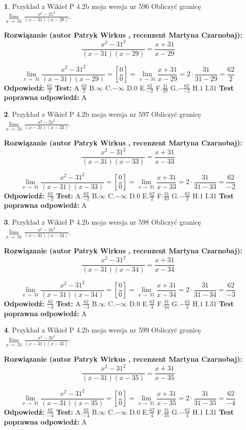 \documentclass[12pt, a4paper]{article}
\theoremstyle{definition} %
\newtheorem{zad}{}
\newcommand{\zadStart}[1]{\begin{zad}#1\newline}
\newcommand{\zadStop}{\end{zad}}
\newcommand{\rozwStart}[2]{\noindent \textbf{Rozwiązanie (autor #1 , recenzent #2): }\newline}
\newcommand{\rozwStop}{\newline}
\newcommand{\odpStart}{\noindent \textbf{Odpowiedź:}\newline}
\newcommand{\odpStop}{\newline}
\newcommand{\testStart}{\noindent \textbf{Test:}\newline}
\newcommand{\testStop}{\newline}
\newcommand{\kluczStart}{\noindent \textbf{Test poprawna odpowiedź:}\newline}
\newcommand{\kluczStop}{\newline}
\begin{document}
\zadStart{Przykład z Wikieł P 4.2b moja wersja nr 596}
Obliczyć granicę $\lim\limits_{x\to\ 31}\frac{x^{2}-31^{2}}{(x-31)(x-29)}$.
\zadStop
\rozwStart{Patryk Wirkus}{Martyna Czarnobaj}
$$\frac{x^{2}-31^{2}}{(x-31)(x-29)}=\frac{x+31}{x-29}$$

$$\lim\limits_{x\to\ 31}\frac{x^{2}-31^{2}}{(x-31)(x-29)}=[\frac{0}{0}]=\lim\limits_{x\to\ 31}\frac{x+31}{x-29}=2 \cdot \frac{31}{31-29} = \frac{62}{2}$$
\rozwStop
\odpStart
$\frac{62}{2}$
\odpStop
\testStart
A.$\frac{62}{2}$
B.$\infty$
C.$-\infty$
D.$0$
E.$\frac{62}{-2}$
F.$\frac{31}{29}$
G.$-\frac{62}{-2}$
H.$1$
I.$31$
\testStop
\kluczStart
A
\kluczStop



\zadStart{Przykład z Wikieł P 4.2b moja wersja nr 597}
Obliczyć granicę $\lim\limits_{x\to\ 31}\frac{x^{2}-31^{2}}{(x-31)(x-33)}$.
\zadStop
\rozwStart{Patryk Wirkus}{Martyna Czarnobaj}
$$\frac{x^{2}-31^{2}}{(x-31)(x-33)}=\frac{x+31}{x-33}$$

$$\lim\limits_{x\to\ 31}\frac{x^{2}-31^{2}}{(x-31)(x-33)}=[\frac{0}{0}]=\lim\limits_{x\to\ 31}\frac{x+31}{x-33}=2 \cdot \frac{31}{31-33} = \frac{62}{-2}$$
\rozwStop
\odpStart
$\frac{62}{-2}$
\odpStop
\testStart
A.$\frac{62}{-2}$
B.$\infty$
C.$-\infty$
D.$0$
E.$\frac{62}{2}$
F.$\frac{31}{33}$
G.$-\frac{62}{2}$
H.$1$
I.$31$
\testStop
\kluczStart
A
\kluczStop



\zadStart{Przykład z Wikieł P 4.2b moja wersja nr 598}
Obliczyć granicę $\lim\limits_{x\to\ 31}\frac{x^{2}-31^{2}}{(x-31)(x-34)}$.
\zadStop
\rozwStart{Patryk Wirkus}{Martyna Czarnobaj}
$$\frac{x^{2}-31^{2}}{(x-31)(x-34)}=\frac{x+31}{x-34}$$

$$\lim\limits_{x\to\ 31}\frac{x^{2}-31^{2}}{(x-31)(x-34)}=[\frac{0}{0}]=\lim\limits_{x\to\ 31}\frac{x+31}{x-34}=2 \cdot \frac{31}{31-34} = \frac{62}{-3}$$
\rozwStop
\odpStart
$\frac{62}{-3}$
\odpStop
\testStart
A.$\frac{62}{-3}$
B.$\infty$
C.$-\infty$
D.$0$
E.$\frac{62}{3}$
F.$\frac{31}{34}$
G.$-\frac{62}{3}$
H.$1$
I.$31$
\testStop
\kluczStart
A
\kluczStop



\zadStart{Przykład z Wikieł P 4.2b moja wersja nr 599}
Obliczyć granicę $\lim\limits_{x\to\ 31}\frac{x^{2}-31^{2}}{(x-31)(x-35)}$.
\zadStop
\rozwStart{Patryk Wirkus}{Martyna Czarnobaj}
$$\frac{x^{2}-31^{2}}{(x-31)(x-35)}=\frac{x+31}{x-35}$$

$$\lim\limits_{x\to\ 31}\frac{x^{2}-31^{2}}{(x-31)(x-35)}=[\frac{0}{0}]=\lim\limits_{x\to\ 31}\frac{x+31}{x-35}=2 \cdot \frac{31}{31-35} = \frac{62}{-4}$$
\rozwStop
\odpStart
$\frac{62}{-4}$
\odpStop
\testStart
A.$\frac{62}{-4}$
B.$\infty$
C.$-\infty$
D.$0$
E.$\frac{62}{4}$
F.$\frac{31}{35}$
G.$-\frac{62}{4}$
H.$1$
I.$31$
\testStop
\kluczStart
A
\kluczStop
\end{document}
